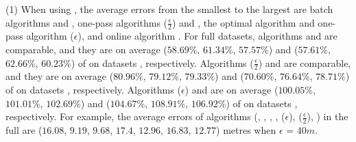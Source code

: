 \sstab (1) When using \ped, the average errors from the smallest
to the largest are batch algorithms \tpa and \dpa, one-pass
algorithms \siped($\frac{\epsilon}{2}$) and \operb, the optimal algorithm \opt and one-pass algorithm \siped(${\epsilon}$), and online algorithm \bqsa.
%
For full datasets, algorithms \tpa and \dpa are comparable, and they are on average ($58.69\%$, $61.34\%$,
$57.57\%$) and ($57.61\%$, $62.66\%$, $60.23\%$) of \opt on datasets \dSets, respectively.
Algorithms \siped($\frac{\epsilon}{2}$) and \operb are comparable, and they are on average
($80.96\%$, $79.12\%$, $79.33\%$) and ($70.60\%$, $76.64\%$, $78.71\%$) of \opt on datasets \dSets, respectively.
%
Algorithms \siped(${\epsilon}$) and \bqsa are on average ($100.05\%$, $101.01\%$, $102.69\%$) and ($104.67\%$, $108.91\%$, $106.92\%$) of \opt on datasets \dSets, respectively.
For example, the average errors of algorithms
(\opt, \tpa, \dpa, \bqsa, \siped(${\epsilon}$), \siped($\frac{\epsilon}{2}$), \operb ) in the full \mopsi are ($16.08$, $9.19$, $9.68$, $17.4$, $12.96$, $16.83$, $12.77$) metres when $\epsilon$ = $40m$.





